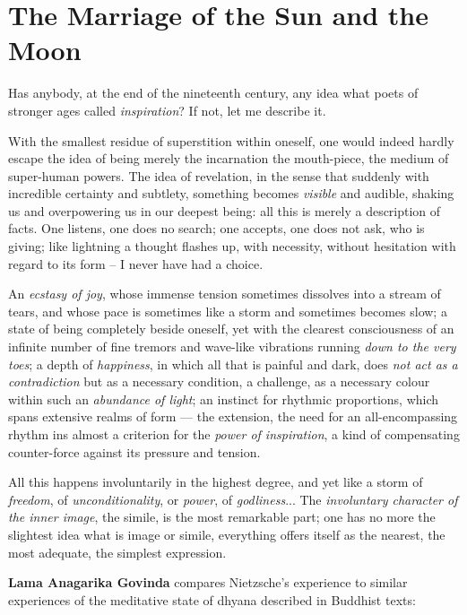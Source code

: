 \section{The Marriage of the Sun and the Moon}

\begin{quotationx}
Has anybody, at the end of the nineteenth century, any idea what poets of stronger ages called \emph{inspiration}? If not, let me describe it.

With the smallest residue of superstition within oneself, one would indeed hardly escape the idea of being merely the incarnation the mouth-piece, the medium of super-human powers. The idea of revelation, in the sense that suddenly with incredible certainty and subtlety, something becomes \emph{visible} and audible, shaking us and overpowering us in our deepest being: all this is merely a description of facts. One listens, one does no search; one accepts, one does not ask, who is giving; like lightning a thought flashes up, with necessity, without hesitation with regard to its form -- I never have had a choice.

An \emph{ecstasy of joy}, whose immense tension sometimes dissolves into a stream of tears, and whose pace is sometimes like a storm and sometimes becomes slow; a state of being completely beside oneself, yet with the clearest consciousness of an infinite number of fine tremors and wave-like vibrations running \emph{down to the very toes}; a depth of \emph{happiness}, in which all that is painful and dark, does \emph{not act as a contradiction} but as a necessary condition, a challenge, as a necessary colour within such an \emph{abundance of light}; an instinct for rhythmic proportions, which spans extensive realms of form --- the extension, the need for an all-encompassing rhythm ins almost a criterion for the \emph{power of inspiration}, a kind of compensating counter-force against its pressure and tension.

All this happens involuntarily in the highest degree, and yet like a storm of \emph{freedom}, of \emph{unconditionality}, or \emph{power}, of \emph{godliness}... The \emph{involuntary character of the inner image}, the simile, is the most remarkable part; one has no more the slightest idea what is image or simile, everything offers itself as the nearest, the most adequate, the simplest expression.
\end{quotationx}


\textbf{Lama Anagarika Govinda} compares Nietzsche's experience to similar experiences of the meditative state of dhyana described in Buddhist texts:

